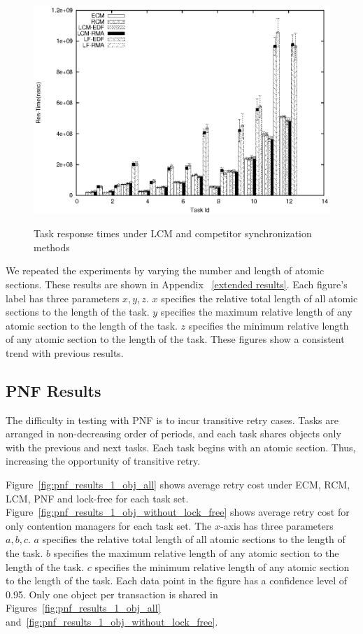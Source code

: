 \documentclass[a4paper,english]{article}
\begin{document}
\begin{figure}[htbp]
{\includegraphics[scale=0.6]{figures/Res_Time_12t_nl_g_30_0.2_0.2_0.2_1.eps}
\label{fig-res-set3-1}
}
\caption{Task response times under LCM and competitor synchronization methods}
\label{fig:res_results-1}
\end{figure}

We repeated the experiments by varying the number and length of atomic sections. These results are shown in Appendix ~\ref{extended results}. Each figure's label has three parameters $x,y,z$. $x$ specifies the relative total length of all atomic sections to the length of the task. $y$ specifies the maximum relative length of any atomic section to the length of the task. $z$ specifies the minimum relative length of any atomic section to the length of the task. These figures show a consistent trend with previous results.

\subsection{PNF Results}
\label{pnf experiemtns}
 
The difficulty in testing with PNF is to incur transitive retry cases. Tasks are arranged in non-decreasing order of periods, and each task shares objects only with the previous and next tasks. Each task begins with an atomic section. Thus, increasing the opportunity of transitive retry.

Figure~\ref{fig:pnf_results_1_obj_all} shows average retry cost under ECM, RCM, LCM, PNF and lock-free for each task set. Figure~\ref{fig:pnf_results_1_obj_without_lock_free} shows average retry cost for only contention managers for each task set. The $x$-axis has three parameters $a,b,c$. $a$ specifies the relative total length of all atomic sections to the length of the task. $b$ specifies the maximum relative length of any atomic section to the length of the task. $c$ specifies the minimum relative length of any atomic section to the length of the task. Each data point in the figure has a confidence level of 0.95.
Only one object per transaction is shared in Figures~\ref{fig:pnf_results_1_obj_all} and~\ref{fig:pnf_results_1_obj_without_lock_free}.
\end{document}
